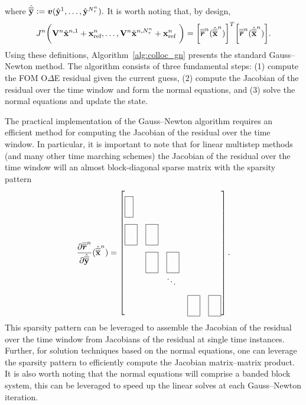 where $\hat{\overline{\overline{\mathbf{y}}}}^{} \vcentcolon= \boldsymbol v (\hat{\mathbf{y}}^{1},\ldots,\hat{\mathbf{y}}^{N_{\tau}^{n}} ).$
It is worth noting that, by design, 
\begin{equation*}
J_{}^{n} \bigg( \mathbf {V}^{n} \hat{\mathbf{x}}^{n,1} + \mathbf{x}_\text{ref}^{n},\ldots,\mathbf {V}^{n} \hat{\mathbf{x}}^{n,N_{\tau}^{n}} + \mathbf{x}_\text{ref}^{n} \ \bigg) 
=
\bigg[\overline{\overline{\boldsymbol r}}^{n}_{\text{}}  (\hat{\overline{\overline{\mathbf {x}}}}^{n}) \bigg]^T \bigg[ \overline{\overline{\boldsymbol r}}^{n}_{\text{}}(\hat{\overline{\overline{\mathbf {x}}}}^{n}) \bigg].
\end{equation*} 
Using these definitions, Algorithm~\ref{alg:colloc_gn} presents the standard Gauss--Newton method. The algorithm consists of three fundamental steps: (1) compute the FOM O$\Delta$E residual given the current guess, (2) compute the Jacobian of the residual over the time window and form the normal equations, and (3) solve the normal equations and update the state. 

The practical implementation of the Gauss--Newton algorithm requires an efficient method for computing the Jacobian of the residual over the time window. In particular, it is important to note that for linear multistep methods (and many other time marching schemes) the Jacobian of the residual over the time window will an almost block-diagonal 
sparse matrix with the sparsity pattern
\begin{equation*}
\frac{\partial \residLMSSlabArg{n}}{\partial \genstatecollocMatySlabArg{}}(\genstatecollocMatSlabArg{n})  =
 \begin{bmatrix*}[l]
\matshapeb & \\%
 \matshapea & \matshapea & \\%
 & \matshapea  & \matshapea & \\%
&  & \ddots & \\%
 & &  & \matshapea &  \matshapea 
\end{bmatrix*}.
\end{equation*}
This sparsity pattern can be leveraged to assemble the Jacobian of the residual over the time window from Jacobians of the residual at single time instances. 
Further, for solution techniques based on the normal equations, one can leverage the sparsity pattern 
to efficiently compute the Jacobian matrix--matrix product.
It is also worth noting that the 
normal equations will comprise a banded block system, this can be leveraged to speed up the linear solves at each Gauss--Newton iteration.

